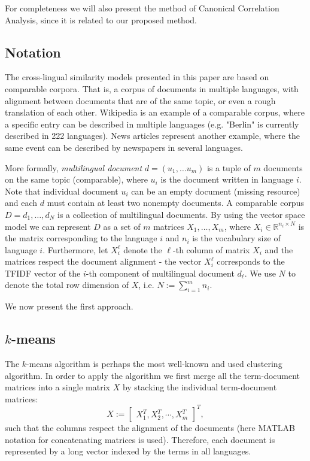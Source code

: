 \documentclass[twoside,11pt]{article}
\newcommand{\RR}{\mathbb{R}}
\begin{document}
For completeness we will also present the method of Canonical Correlation Analysis, since it is related to our proposed method.

\subsection{Notation}

The cross-lingual similarity models presented in this paper are based on comparable corpora. That is, a corpus of documents in multiple languages, with alignment between documents that are of the same topic, or even a rough translation of each other. Wikipedia is an example of a comparable corpus, where a specific entry can be described in multiple languages (e.g. "Berlin" is currently described in 222 languages). News articles represent another example, where the same event can be described by newspapers in several languages.

More formally, \emph{multilingual document} $d = (u_1,\ldots u_m)$ is a tuple of $m$ documents on the same topic (comparable), where $u_i$ is the document written in language $i$. Note that individual document $u_i$ can be an empty document (missing resource) and each $d$ must contain at least two nonempty documents. A comparable corpus $D = {d_1, \ldots, d_N}$ is a collection of multilingual documents. By using the vector space model we can represent $D$ as a set of $m$ matrices $X_1,\ldots,X_m$, where $X_i \in \RR^{n_i \times N}$ is the matrix corresponding to the language $i$ and $n_i$ is the vocabulary size of language $i$. Furthermore, let $X_i^{\ell}$ denote the $\ell$-th column of matrix $X_i$ and the matrices respect the document alignment - the vector $X_i^\ell$ corresponds to the TFIDF vector of the $i$-th component of multilingual document $d_\ell$. We use $N$ to denote the total row dimension of $X$, i.e. $N:= \sum_{i=1}^m n_i$.

We now present the first approach.

\subsection{$k$-means}

The $k$-means algorithm is perhaps the most well-known and used clustering algorithm. In order to apply the algorithm we first merge all the term-document matrices into a single matrix $X$ by stacking the individual term-document matrices:
$$X := \begin{bmatrix}X_1^T ,X_2^T, \cdots, X_m^T \end{bmatrix}^T,$$
such that the columns respect the alignment of the documents (here MATLAB notation for concatenating matrices is used). Therefore, each document  is represented by a long vector indexed by the terms in all languages.
\end{document}
